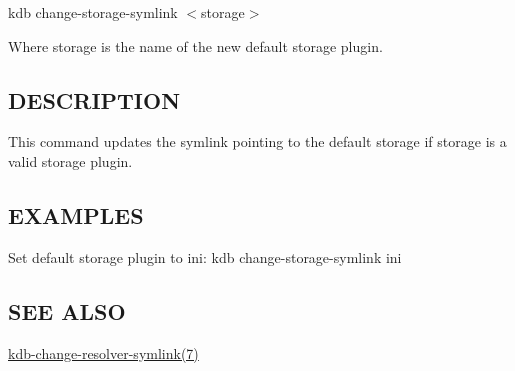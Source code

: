 {\ttfamily kdb change-\/storage-\/symlink $<$storage$>$}

Where {\ttfamily storage} is the name of the new default storage plugin.

\subsection*{D\+E\+S\+C\+R\+I\+P\+T\+I\+ON}

This command updates the symlink pointing to the default storage if {\ttfamily storage} is a valid storage plugin.

\subsection*{E\+X\+A\+M\+P\+L\+ES}

Set default storage plugin to ini\+: {\ttfamily kdb change-\/storage-\/symlink ini}

\subsection*{S\+EE A\+L\+SO}


\begin{DoxyItemize}
\item \hyperlink{md_doc_help_kdb-change-resolver-symlink_doc_help_kdb-change-resolver-symlink_md}{kdb-\/change-\/resolver-\/symlink(7)} 
\end{DoxyItemize}